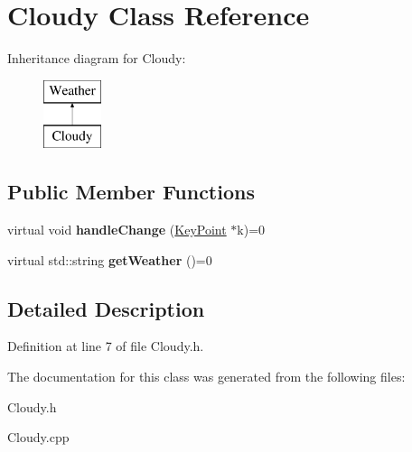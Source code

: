\hypertarget{classCloudy}{}\section{Cloudy Class Reference}
\label{classCloudy}
Inheritance diagram for Cloudy\+:\begin{figure}[H]
\begin{center}
\leavevmode
\includegraphics[height=2.000000cm]{classCloudy}
\end{center}
\end{figure}
\subsection*{Public Member Functions}
\begin{DoxyCompactItemize}
\item 
\mbox{\label{classCloudy_a938139a3d4e4cf81e70db6b4f89735a4}} 
virtual void {\bfseries handle\+Change} (\hyperlink{classKeyPoint}{Key\+Point} $\ast$k)=0
\item 
\mbox{\label{classCloudy_aa96a80b53830f8bb895df245e3a7b552}} 
virtual std\+::string {\bfseries get\+Weather} ()=0
\end{DoxyCompactItemize}


\subsection{Detailed Description}


Definition at line 7 of file Cloudy.\+h.



The documentation for this class was generated from the following files\+:\begin{DoxyCompactItemize}
\item 
Cloudy.\+h\item 
Cloudy.\+cpp\end{DoxyCompactItemize}
